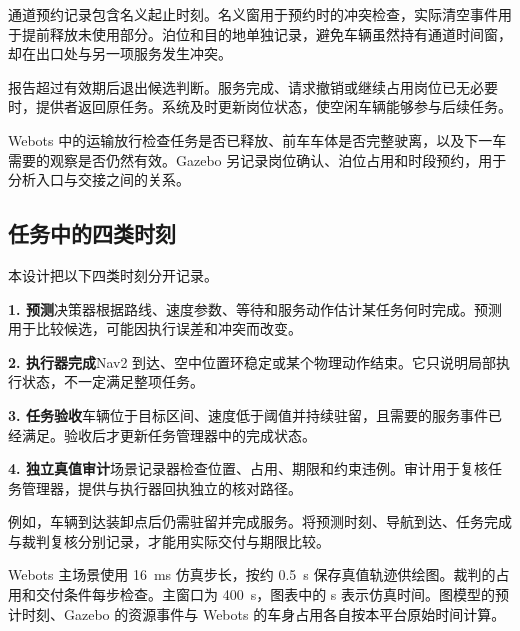 通道预约记录包含名义起止时刻。名义窗用于预约时的冲突检查，实际清空事件用于提前释放未使用部分。泊位和目的地单独记录，避免车辆虽然持有通道时间窗，却在出口处与另一项服务发生冲突。

报告超过有效期后退出候选判断。服务完成、请求撤销或继续占用岗位已无必要时，提供者返回原任务。系统及时更新岗位状态，使空闲车辆能够参与后续任务。

Webots 中的运输放行检查任务是否已释放、前车车体是否完整驶离，以及下一车需要的观察是否仍然有效。Gazebo 另记录岗位确认、泊位占用和时段预约，用于分析入口与交接之间的关系。

\subsection{任务中的四类时刻}\label{sec:1.6}

本设计把以下四类时刻分开记录。

\noindent\textbf{1. 预测}\quad 决策器根据路线、速度参数、等待和服务动作估计某任务何时完成。预测用于比较候选，可能因执行误差和冲突而改变。

\noindent\textbf{2. 执行器完成}\quad Nav2 到达、空中位置环稳定或某个物理动作结束。它只说明局部执行状态，不一定满足整项任务。

\noindent\textbf{3. 任务验收}\quad 车辆位于目标区间、速度低于阈值并持续驻留，且需要的服务事件已经满足。验收后才更新任务管理器中的完成状态。

\noindent\textbf{4. 独立真值审计}\quad 场景记录器检查位置、占用、期限和约束违例。审计用于复核任务管理器，提供与执行器回执独立的核对路径。

例如，车辆到达装卸点后仍需驻留并完成服务。将预测时刻、导航到达、任务完成与裁判复核分别记录，才能用实际交付与期限比较。

Webots 主场景使用 16~ms 仿真步长，按约 0.5~s 保存真值轨迹供绘图。裁判的占用和交付条件每步检查。主窗口为 400~s，图表中的 s 表示仿真时间。图模型的预计时刻、Gazebo 的资源事件与 Webots 的车身占用各自按本平台原始时间计算。
